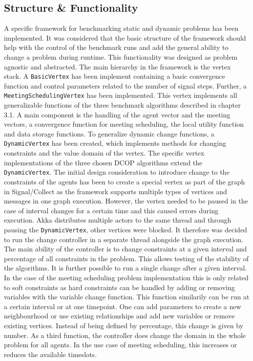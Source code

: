 \subsection{Structure \& Functionality}
A specific framework for benchmarking static and dynamic problems has been implemented. It was considered that the basic structure of the framework should help with the control of the benchmark runs and add the general ability to change a problem during runtime. This functionality was designed as problem agnostic and abstracted. The main hierarchy in the framework is the vertex stack. A \texttt{BasicVertex} has been implement containing a basic convergence function and control parameters related to the number of signal steps. Further, a \texttt{MeetingSchedulingVertex} has been implemented. This vertex implements all generalizable functions of the three benchmark algorithms described in chapter 3.1. A main component is the handling of the agent vector and the meeting vectors, a convergence function for meeting scheduling, the local utility function and data storage functions. 
To generalize dynamic change functions, a \texttt{DynamicVertex} has been created, which implements methods for changing constraints and the value domain of the vertex. The specific vertex implementations of the three chosen DCOP algorithms extend the \texttt{DynamicVertex}.
\newline \newline \newline \newline
The initial design consideration to introduce change to the constraints of the agents has been to create a special vertex as part of the graph in Signal/Collect as the framework supports multiple types of vertices and messages in one graph execution. However, the vertex needed to be paused in the case of interval changes for a certain time and this caused errors during execution. Akka distributes multiple actors to the same thread and through pausing the \texttt{DynamicVertex}, other vertices were blocked. It therefore was decided to run the change controller in a separate thread alongside the graph execution. The main ability of the controller is to change constraints at a given interval and percentage of all constraints in the problem. This allows testing of the stability of the algorithms. It is further possible to run a single change after a given interval. In the case of the meeting scheduling problem implementation this is only related to soft constraints as hard constraints can be handled by adding or removing variables with the variable change function. This function similarily can be run at a certain interval or at one timepoint.  One can add parameters to create a new neighbourhood or use existing relationships and add new variables or remove existing vertices. Instead of being defined by percentage, this change is given by number. As a third function, the controller does change the domain in the whole problem for all agents. In the use case of meeting scheduling, this increases or reduces the available timeslots.
